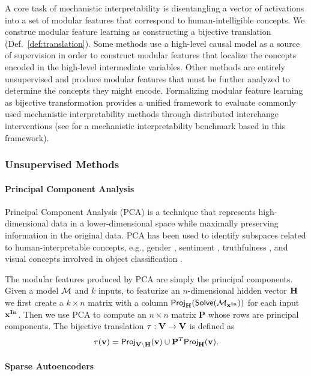 \documentclass[twoside,11pt]{article}
\begin{document}
A core task of mechanistic interpretability is disentangling a vector of activations into a set of modular features that correspond to human-intelligible concepts. We construe modular feature learning as constructing a bijective translation (Def.~\ref{def:translation}). Some methods use a high-level causal model as a source of supervision in order to construct modular features that localize the concepts encoded in the high-level intermediate variables. Other methods are entirely unsupervised and produce modular features that must be further analyzed to determine the concepts they might encode. Formalizing modular feature learning as bijective transformation provides a unified framework to evaluate commonly used mechanistic interpretability methods through distributed interchange interventions (see \citealt{huang2024ravel} for a mechanistic interpretability benchmark based in this framework).


\subsubsection{Unsupervised Methods}

\paragraph{Principal Component Analysis}

Principal Component Analysis (PCA) is a technique that represents high-dimensional data in a lower-dimensional space while maximally preserving information in the original data. PCA has been used to identify subspaces related to human-interpretable concepts, e.g., gender \citep{bolukbasi2016man}, sentiment \citep{tigges2023linear}, truthfulness \citep{marks2023geometry}, and visual concepts involved in object classification \citep{chormai2022disentangled}.

The modular features produced by PCA are simply the principal components. Given a model $\mathcal{M}$ and $k$ inputs, to featurize an $n$-dimensional hidden vector $\mathbf{H}$ we first create a $k \times n$ matrix with a column $\mathsf{Proj}_{\mathbf{H}}(\mathsf{Solve}(\mathcal{M}_{\mathbf{x}^{\mathbf{In}}}))$ for each input $\mathbf{x}^{\mathbf{In}}$. Then we use PCA to compute an $n \times n$ matrix $\mathbf{P}$ whose rows are principal components. The bijective translation $\tau: \mathbf{V} \to \mathbf{V}$ is defined as 
\[\tau(\mathbf{v}) = \mathsf{Proj}_{\mathbf{V} \setminus \mathbf{H}}(\mathbf{v}) \cup \mathbf{P}^{T} \mathsf{Proj}_{\mathbf{H}}(\mathbf{v}).\]

\paragraph{Sparse Autoencoders}
\end{document}
